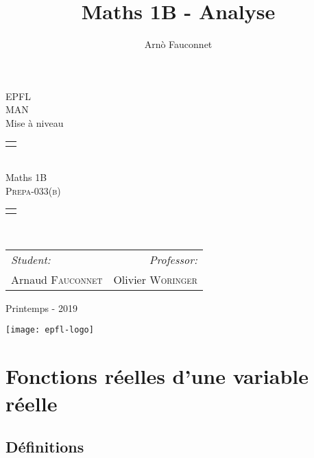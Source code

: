 \documentclass[
    11pt,
    a4paper,
    oneside,
    headinlcude, footinclude,
    twoside,
]{report}
\title{Maths 1B - Analyse}
\author{Arnò Fauconnet}
\begin{document}
\begin{titlepage}
   \begin{center}
       \vspace*{\fill}

       {\Huge EPFL}\\ 
       \vfill
       {\huge MAN}\\ [1em]
       {\Large Mise à niveau}\\
        \vfill
        \begin{tabularx}{\textwidth}{X}
            \Xhline{3\arrayrulewidth}\\
        \end{tabularx}\\ [2em]
        {\Huge Maths 1B} \\ [1em]
        \textsc{\huge Prepa-033(b)} \\ [2em]
        \begin{tabularx}{\textwidth}{X}
            \Xhline{3\arrayrulewidth}\\
        \end{tabularx}\\ [2em]
        \vspace{.7cm}
        {\large
        \begin{tabularx}{.9\textwidth}{Xr}
            \textit{Student:} & \textit{Professor:}\\
            Arnaud \textsc{Fauconnet} & Olivier \textsc{Woringer}
        \end{tabularx}}
        \vfill
        {\Large Printemps - 2019}

        \vfill
        \texttt{[image: epfl-logo]}

       \vfill
   \end{center} 
\end{titlepage} 
\setcounter{chapter}{1}
\chapter{Fonctions réelles d'une variable réelle}

\section{Définitions}
\label{sec:definitions}
\end{document}
